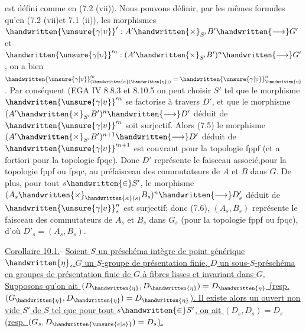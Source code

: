 \par\noindent\handwritten{\rule{\linewidth}{0.3pt}}\par
{}\par
{}
est défini comme en (7.2 (vii)). Nous pouvons définir, par les mêmes formules qu'en (7.2 (vii)et 7.1 (ii)), les morphismes $\handwritten{\unsure{\gamma|\upsilon}}':A'\handwritten{\times}_{S'}B'\handwritten{\longrightarrow}G'$ et $\handwritten{\unsure{\gamma|\upsilon}}'^n:(A'\handwritten{\times}_{S'}B')^n\handwritten{\longrightarrow}G'$, on a bien $\handwritten{\unsure{\gamma|\upsilon}}'^n_{(\handwritten{\kappa}(\handwritten{\eta}))}=\handwritten{\unsure{\gamma|\upsilon}}^n_{\handwritten{\eta}}$. Par conséquent (EGA IV 8.8.3 et 8.10.5\deleted{)}\handwritten{,} on peut choisir $S'$ tel que le morphisme $\handwritten{\unsure{\gamma|\upsilon}}'^n$ se factorise à travers $D'$, et que le morphisme $(A'\handwritten{\times}_{S'}B')^n\handwritten{\longrightarrow}D'$ déduit de $\handwritten{\unsure{\gamma|\upsilon}}'^n$ soit surjectif. Alors (7.5) le morphisme $(A'\handwritten{\times}_{S'}B')^{n+1}\handwritten{\longrightarrow}D'$ déduit de $\handwritten{\unsure{\gamma|\upsilon}}'^{n+1}$ est couvrant pour la topologie fppf (et a fortiori pour la topologie fpqc). Donc $D'$ représente le faisceau associé,pour la topologie fppf ou fpqc, au préfaisceau des commutateurs de $A$ et $B$ dans $G$. De plus, pour tout $s\handwritten{\in}S'$, le morphisme $(A_s\handwritten{\times}_{\handwritten{\kappa}(s)}B_s)^n\handwritten{\longrightarrow}D'_s$ déduit de $\handwritten{\unsure{\gamma|\upsilon}}^n_s$ est surjectif; donc (7.6), $(A_s,B_s)$ représente le faisceau des commutateurs de $A_s$ et $B_s$ dans $G_s$ (pour la topologie fppf ou fpqc), d'où $D'_s=(A_s,B_s)$.

\uline{Corollaire 10.1.}- \uline{Soient $S$ un préschéma intègre de point générique $\handwritten{\eta}$, $G$ un $S$-groupe de présentation finie, $D$ un sous-$S$-préschéma en groupes de présentation finie de $G$ à fibres lisses et invariant dans $G$. Supposons qu'on ait $(D_{\handwritten{\eta}},D_{\handwritten{\eta}})=D_{\handwritten{\eta}}$ (resp. $(G_{\handwritten{\eta}},D_{\handwritten{\eta}})=D_{\handwritten{\eta}}$). Il existe alors un ouvert non vide $S'$ de $S$ tel que pour tout $s\handwritten{\in}S'$, on ait $(D_s,D_s)=D_s$ (resp. $(G_s,D_{\handwritten{\unsure{e|s}}})=D_s$).}

